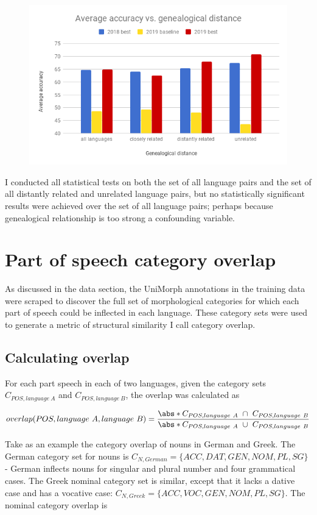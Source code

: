 \begin{figure}[ht]
\includegraphics[width=12cm]{images/Average_accuracy_vs_genealogical_distance.png}
\centering
\end{figure}

I conducted all statistical tests on both the set of all language pairs and the set of all distantly related and unrelated language pairs, but no statistically significant results were achieved over the set of all language pairs; perhaps because genealogical relationship is too strong a confounding variable.

\section{Part of speech category overlap}

As discussed in the data section, the UniMorph annotations in the training data were scraped to discover the full set of morphological categories for which each part of speech could be inflected in each language. These category sets were used to generate a metric of structural similarity I call category overlap.

\subsection{Calculating overlap}

For each part speech in each of two languages, given the category sets $C_{POS, language\ A}$ and $C_{POS, language\ B}$, the overlap was calculated as

\[overlap(POS, language\ A, language\ B) = \frac{\abs*{C_{POS, language\ A}\ \cap\ C_{POS, language\ B}}}{\abs*{C_{POS, language\ A}\ \cup\ C_{POS, language\ B}}}\]

Take as an example the category overlap of nouns in German and Greek. The German category set for nouns is $C_{N,German} = \{ACC, DAT, GEN, NOM, PL, SG\}$ - German inflects nouns for singular and plural number and four grammatical cases. The Greek nominal category set is similar, except that it lacks a dative case and has a vocative case: $C_{N,Greek} = \{ACC, VOC, GEN, NOM, PL, SG\}$. The nominal category overlap is 

